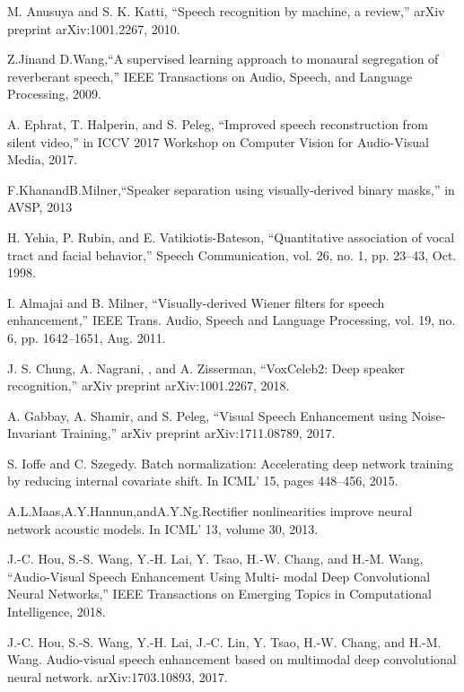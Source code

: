 \documentclass[runningheads,a4paper]{llncs}
\begin{document}
\begin{thebibliography}{4}

 M. Anusuya and S. K. Katti, “Speech recognition by machine, a review,” arXiv preprint arXiv:1001.2267, 2010.


 Z.Jinand D.Wang,“A supervised learning approach to monaural segregation of reverberant speech,” IEEE Transactions on Audio, Speech, and Language Processing, 2009.


  A. Ephrat, T. Halperin, and S. Peleg, “Improved speech reconstruction from silent video,” in ICCV 2017 Workshop on Computer Vision for Audio-Visual Media, 2017.


 F.KhanandB.Milner,“Speaker separation using visually-derived binary masks,” in AVSP, 2013


  H. Yehia, P. Rubin, and E. Vatikiotis-Bateson, “Quantitative association of vocal tract and facial behavior,” Speech Communication, vol. 26, no. 1, pp. 23–43, Oct. 1998.


 I. Almajai and B. Milner, “Visually-derived Wiener filters for speech enhancement,” IEEE Trans. Audio, Speech and Language Processing, vol. 19, no. 6, pp. 1642–1651, Aug. 2011.


 J. S. Chung, A. Nagrani, , and A. Zisserman, “VoxCeleb2: Deep speaker recognition,” arXiv preprint arXiv:1001.2267, 2018.


 A. Gabbay, A. Shamir, and S. Peleg, “Visual Speech Enhancement using Noise-Invariant Training,” arXiv preprint arXiv:1711.08789, 2017.


 S. Ioffe and C. Szegedy. Batch normalization: Accelerating deep network training by reducing internal covariate shift. In ICML’ 15, pages 448–456, 2015.


 A.L.Maas,A.Y.Hannun,andA.Y.Ng.Rectifier nonlinearities improve neural network acoustic models. In ICML’ 13, volume 30, 2013.


 J.-C. Hou, S.-S. Wang, Y.-H. Lai, Y. Tsao, H.-W. Chang, and H.-M. Wang, “Audio-Visual Speech Enhancement Using Multi- modal Deep Convolutional Neural Networks,” IEEE Transactions on Emerging Topics in Computational Intelligence, 2018.


 J.-C. Hou, S.-S. Wang, Y.-H. Lai, J.-C. Lin, Y. Tsao, H.-W. Chang, and H.-M. Wang. Audio-visual speech enhancement based on multimodal deep convolutional neural network. arXiv:1703.10893, 2017.


\end{thebibliography}
\end{document}
